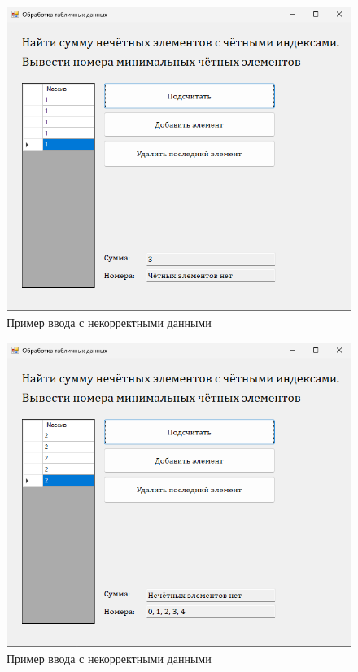 \begin{figure}
\centering
\includegraphics[width=0.5\linewidth]{images//handling-data-easy/error2.png}
\caption{Пример ввода с некорректными данными}
\label{fig:handling-data-easy-error2}
\end{figure}

\begin{figure}
\centering
\includegraphics[width=0.5\linewidth]{images//handling-data-easy/error3.png}
\caption{Пример ввода с некорректными данными}
\label{fig:handling-data-easy-error3}
\end{figure}

